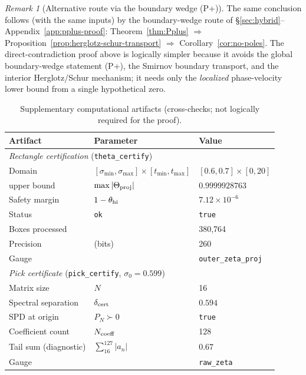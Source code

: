 \documentclass[11pt]{amsart}
\theoremstyle{definition}
\theoremstyle{remark}
\newtheorem{remark}[theorem]{Remark}
\begin{document}
\begin{remark}[Alternative route via the boundary wedge \textup{(P+)}]\label{rem:Pplus-route}
The same conclusion follows (with the same inputs) by the boundary-wedge route
of \S\ref{sec:hybrid}--Appendix~\ref{app:pplus-proof}:
Theorem~\ref{thm:Pplus} $\Rightarrow$ Proposition~\ref{prop:herglotz-schur-transport}
$\Rightarrow$ Corollary~\ref{cor:no-poles}.
The direct-contradiction proof above is logically simpler because it avoids the
global boundary-wedge statement \textup{(P+)}, the Smirnov boundary transport,
and the interior Herglotz/Schur mechanism;
it needs only the \emph{localized} phase-velocity lower bound from a single hypothetical zero.
\end{remark}
\begin{table}[H]
\centering
\caption{Supplementary computational artifacts (cross-checks; not logically required for the proof).}\label{tab:artifact-data}
\small
\begin{tabular}{l l l}
\toprule
\textbf{Artifact} & \textbf{Parameter} & \textbf{Value} \\
\midrule
\multicolumn{3}{l}{\textit{Rectangle certification} (\texttt{theta\_certify})} \\
\quad Domain & $[\sigma_{\min}, \sigma_{\max}] \times [t_{\min}, t_{\max}]$ & $[0.6, 0.7] \times [0, 20]$ \\
\quad  upper bound & $\max |\Theta_{\rm proj}|$ & $0.9999928763$ \\
\quad Safety margin & $1 - \theta_{\rm hi}$ & $7.12 \times 10^{-6}$ \\
\quad Status & \texttt{ok} & \texttt{true} \\
\quad Boxes processed & & 380{,}764 \\
\quad Precision & (bits) & 260 \\
\quad Gauge & & \texttt{outer\_zeta\_proj} \\
\midrule
\multicolumn{3}{l}{\textit{Pick certificate} (\texttt{pick\_certify}, $\sigma_0 = 0.599$)} \\
\quad Matrix size & $N$ & 16 \\
\quad Spectral separation & $\delta_{\rm cert}$ & $0.594$ \\
\quad SPD at origin & $P_N \succ 0$ & \texttt{true} \\
\quad Coefficient count & $N_{\rm coeff}$ & 128 \\
\quad Tail sum (diagnostic) & $\sum_{16}^{127}|a_n|$ & $0.67$ \\
\quad Gauge & & \texttt{raw\_zeta} \\

\end{tabular}
\end{table}
\end{document}
